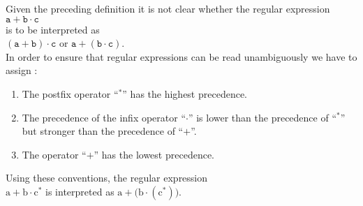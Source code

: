 Given the preceding definition it is not clear whether the regular expression
\\[0.2cm]
\hspace*{1.3cm}
$\mathtt{a}+\mathtt{b}\cdot\mathtt{c}$ 
\\[0.2cm]
is to be interpreted as 
\\[0.2cm]
\hspace*{1.3cm}
$(\mathtt{a}+\mathtt{b})\cdot\mathtt{c}$ \quad or \quad $\mathtt{a}+(\mathtt{b}\cdot\mathtt{c})$.
\\[0.2cm]
In order to ensure that regular expressions can be read unambiguously we have to assign :
\begin{enumerate}
\item The postfix operator ``$^*$'' has the highest precedence.
\item The precedence of the infix operator ``$\cdot$'' is lower than the precedence of  ``$^*$'' but
      stronger than the precedence of ``$+$''.
\item The operator ``$+$'' has the lowest precedence.
\end{enumerate}
Using these conventions, the regular expression 
\\[0.2cm]
\hspace*{1.3cm}
$\mathrm{a} + \mathrm{b} \cdot \mathrm{c}^*$ \quad is interpreted as  \quad
$\mathrm{a} + \bigl(\mathrm{b} \cdot (\mathrm{c}^*)\bigr)$.

